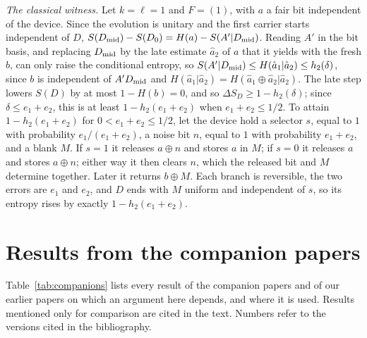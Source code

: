 \documentclass[11pt]{article}
\theoremstyle{definition}
\theoremstyle{remark}
\begin{document}
\emph{The classical witness.} Let $k=\ell=1$ and $F=(1)$, with $a$ a fair bit independent of the device. Since the evolution is unitary and the first carrier starts independent of $D$, $S(D_{\rm mid})-S(D_0)=H(a)-S(A'|D_{\rm mid})$. Reading $A'$ in the bit basis, and replacing $D_{\rm mid}$ by the late estimate $\hat a_2$ of $a$ that it yields with the fresh $b$, can only raise the conditional entropy, so $S(A'|D_{\rm mid})\le H(\hat a_1|\hat a_2)\le h_2(\delta)$, since $b$ is independent of $A'D_{\rm mid}$ and $H(\hat a_1|\hat a_2)=H(\hat a_1\oplus\hat a_2|\hat a_2)$. The late step lowers $S(D)$ by at most $1-H(b)=0$, and so $\Delta S_D\ge1-h_2(\delta)$; since $\delta\le e_1+e_2$, this is at least $1-h_2(e_1+e_2)$ when $e_1+e_2\le1/2$. To attain $1-h_2(e_1+e_2)$ for $0<e_1+e_2\le1/2$, let the device hold a selector $s$, equal to $1$ with probability $e_1/(e_1+e_2)$, a noise bit $n$, equal to $1$ with probability $e_1+e_2$, and a blank $M$. If $s=1$ it releases $a\oplus n$ and stores $a$ in $M$; if $s=0$ it releases $a$ and stores $a\oplus n$; either way it then clears $n$, which the released bit and $M$ determine together. Later it returns $b\oplus M$. Each branch is reversible, the two errors are $e_1$ and $e_2$, and $D$ ends with $M$ uniform and independent of $s$, so its entropy rises by exactly $1-h_2(e_1+e_2)$.

\section{Results from the companion papers}\label{app:companions}

Table~\ref{tab:companions} lists every result of the companion papers and of our earlier papers on which an argument here depends, and where it is used. Results mentioned only for comparison are cited in the text. Numbers refer to the versions cited in the bibliography.
\end{document}
